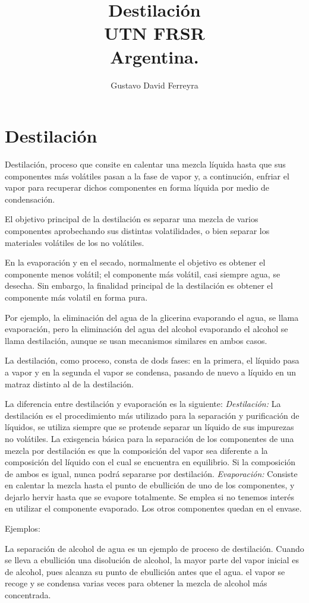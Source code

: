 \documentclass[a4paper,12pt]{book}
\title{Destilación \\ UTN FRSR \\ Argentina.}
\author{Gustavo David Ferreyra}
\begin{document}
\maketitle
\chapter{Destilación}
Destilación, proceso que consite en calentar una mezcla líquida hasta que sus componentes más 
volátiles pasan a la fase de vapor y, a continución, enfriar el vapor para recuperar dichos 
componentes en forma líquida por medio de condensación.

El objetivo principal de la destilación es separar una mezcla de varios componentes aprobechando 
sus distintas volatilidades, o bien separar los materiales volátiles de los no volátiles.

En la evaporación y en el secado, normalmente el objetivo es obtener el componente menos volátil;
el componente más volátil, casi siempre agua, se desecha. Sin embargo, la finalidad principal 
de la destilación es obtener el componente más volatil en forma pura.

Por ejemplo, la eliminación del agua de la glicerina evaporando el agua, se llama evaporación, pero 
la eliminación del agua del alcohol evaporando el alcohol se llama destilación, aunque se usan 
mecanismos similares en ambos casos.

La destilación, como proceso, consta de dods fases: en la primera, el líquido pasa a vapor y en la 
segunda el vapor se condensa, pasando de nuevo a líquido en un matraz distinto al de la destilación.

La diferencia entre destilación y evaporación es la siguiente:
\textit{Destilación:} La destilación es el procedimiento más utilizado para la separación y purificación de 
líquidos, se utiliza siempre  que se protende separar un líquido de sus impurezas no volátiles.
La exisgencia básica para la separación de los componentes de una mezcla por destilación es que la 
composición del vapor sea diferente a la composición del líquido con el cual se encuentra en equilibrio. Si 
la composición de ambos es igual, nunca podrá separarse por destilación.
\textit{Evaporación:} Consiste en calentar la mezcla hasta el punto de ebullición de uno de los 
componentes, y dejarlo hervir hasta que se evapore totalmente. Se emplea si no tenemos interés 
en utilizar el componente evaporado. Los otros componentes quedan en el envase.

Ejemplos:

La separación de alcohol de agua es un ejemplo de proceso de destilación. Cuando se lleva a ebullición 
una disolución de alcohol, la mayor parte del vapor inicial es de alcohol, pues alcanza su punto de 
ebullición antes que el agua. el vapor se recoge y se condensa varias veces para obtener la mezcla de alcohol
más concentrada.
\end{document}
